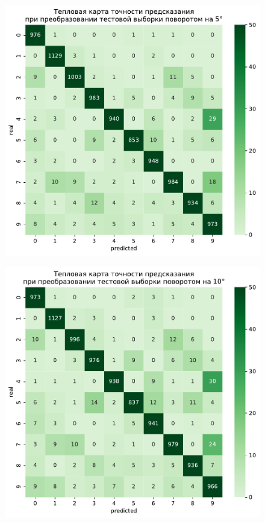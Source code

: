 \documentclass{article}
\begin{document}
\newpage
\begin{figure}[h]	
	\subfigure
	{
        \begin{minipage}{8cm}
            \centering
            \includegraphics[scale=0.33]{TASK1 test rotated5.pdf}
        \end{minipage}
        \label{app6:rot5}
	}
	\subfigure
	{
		\begin{minipage}{8cm}
			\centering
			\includegraphics[scale=0.33]{TASK1 test rotated10.pdf}

\end{minipage}}
\end{figure}
\end{document}
